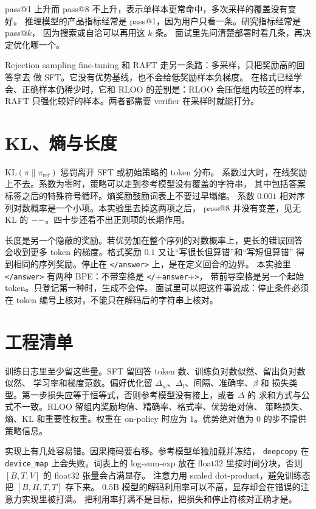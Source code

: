 \documentclass[10pt,twocolumn,a4paper]{ctexart}
\begin{document}
pass@1 上升而 pass@8 不上升，表示单样本更常命中，多次采样的覆盖没有变好。
推理模型的产品指标经常是 pass@1，因为用户只看一条。研究指标经常是 pass@$k$，
因为搜索或自洽可以再用这 $k$ 条\citep{lightman2023verify,deepseek2025r1}。
面试里先问清楚部署时看几条，再决定优化哪一个。

Rejection sampling fine-tuning 和 RAFT 走另一条路：多采样，只把奖励高的回答拿去
做 SFT\citep{dong2023raft}。它没有优势基线，也不会给低奖励样本负梯度。
在格式已经学会、正确样本仍稀少时，它和 RLOO 的差别是：RLOO 会压低组内较差的样本，
RAFT 只强化较好的样本。两者都需要 verifier 在采样时就能打分。

\section{KL、熵与长度}
KL$(\pi\|\pi_{\mathrm{ref}})$ 惩罚离开 SFT 或初始策略的 token 分布。
系数过大时，在线奖励上不去。系数为零时，策略可以走到参考模型没有覆盖的字符串，
其中包括答案标签之后的特殊符号循环。熵奖励鼓励词表上不要过早塌缩。
系数 $0.001$ 相对序列对数概率是一个小项。本实验里去掉这两项之后，
pass@8 并没有变差，见无 KL 的 $--$。四十步还看不出正则项的长期作用。

长度是另一个隐蔽的奖励。若优势加在整个序列的对数概率上，更长的错误回答
会收到更多 token 的梯度。格式奖励 $0.1$ 又让``写很长但算错''和``写短但算错''
得到相同的序列奖励。停止在 \texttt{</answer>} 上，是在定义回合的边界。
本实验里 \texttt{</answer>} 有两种 BPE：不带空格是 \texttt{</}+\texttt{answer}+\texttt{>}，
带前导空格是另一个起始 token。只登记第一种时，生成不会停。
面试里可以把这件事说成：停止条件必须在 token 编号上核对，不能只在解码后的字符串上核对。

\section{工程清单}
训练日志里至少留这些量。SFT 留回答 token 数、训练负对数似然、留出负对数似然、
学习率和梯度范数。偏好优化留 $\Delta_w$、$\Delta_l$、间隔、准确率、$\beta$ 和
损失类型。第一步损失应等于恒等式，否则参考模型没有接上，或者 $\Delta$ 的
求和方式与公式不一致。RLOO 留组内奖励均值、精确率、格式率、优势绝对值、
策略损失、熵、KL 和重要性权重。权重在 on-policy 时应为 $1$。优势绝对值为 $0$
的步不提供策略信息。

实现上有几处容易错。因果掩码要右移。参考模型单独加载并冻结，
\texttt{deepcopy} 在 \texttt{device\_map} 上会失败。词表上的 log-sum-exp 放在
float32 里按时间分块，否则 $[B,T,V]$ 的 float32 张量会占满显存。
注意力用 scaled dot-product，避免训练态把 $[B,H,T,T]$ 存下来。
$0.5$B 模型的解码利用率可以不高，显存却会在错误的注意力实现里被打满。
把利用率打满不是目标，把损失和停止符核对正确才是。
\end{document}
